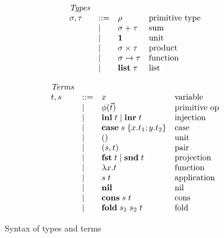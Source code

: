 \begin{figure}
  \begin{subfigure}[t]{0.48\linewidth}
  \small
  \[
  \begin{array}{lllll}
    & \textit{Types}
    \\
    &
    \sigma, \tau
    & ::= &
    \rho
    &
    \text{primitive type}
    \\
    && \mid &
    \sigma + \tau
    &
    \text{sum}
    \\
    && \mid &
    \mathbf{1}
    &
    \text{unit}
    \\
    && \mid &
    \sigma \times \tau
    &
    \text{product}
    \\
    && \mid &
    \sigma \to \tau
    &
    \text{function}
    \\
    && \mid &
    \mathbf{list}\;\tau
    &
    \text{list}
  \end{array}
  \]
  \end{subfigure}%
  \begin{subfigure}[t]{0.48\linewidth}
  \small
  \[
  \begin{array}{lllll}
    & \textit{Terms}
    \\
    &
    t, s
    & ::= &
    x
    &
    \text{variable}
    \\
    && \mid &
    \phi(\vec t)
    &
    \text{primitive op}
    \\
    && \mid &
    \mathbf{inl}\;t \mid \mathbf{inr}\;t
    &
    \text{injection}
    \\
    && \mid &
    \mathbf{case}\;s\;\{x.t_1; y.t_2\}
    &
    \text{case}
    \\
    && \mid &
    ()
    &
    \text{unit}
    \\
    && \mid &
    (s,t)
    &
    \text{pair}
    \\
    && \mid &
    \mathbf{fst}\;t \mid \mathbf{snd}\;t
    &
    \text{projection}
    \\
    && \mid &
    \lambda x.t
    &
    \text{function}
    \\
    && \mid &
    s\;t
    &
    \text{application}
    \\
    && \mid &
    \mathbf{nil}
    &
    \text{nil}
    \\
    && \mid &
    \mathbf{cons}\;s\;t
    &
    \text{cons}
    \\
    && \mid &
    \mathbf{fold}\;s_1\;s_2\;t
    &
    \text{fold}
  \end{array}
  \]
  \end{subfigure}
  \caption{Syntax of types and terms}
  \label{fig:syntax}
\end{figure}
